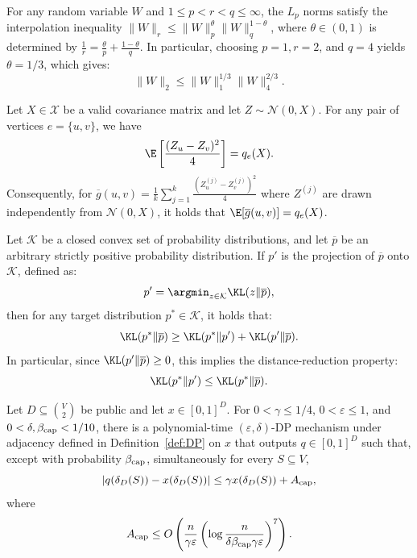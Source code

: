 \begin{lemma}\label{lem:holder_interpolation}
For any random variable $W$ and $1 \le p < r < q \le \infty$, the $L_p$ norms satisfy the interpolation inequality $\|W\|_r \le \|W\|_p^\theta \|W\|_q^{1-\theta}$, where $\theta \in (0, 1)$ is determined by $\frac{1}{r} = \frac{\theta}{p} + \frac{1-\theta}{q}$.
In particular, choosing $p=1, r=2$, and $q=4$ yields $\theta = 1/3$, which gives:
\[
    \|W\|_2 \le \|W\|_1^{1/3} \|W\|_4^{2/3}.
\]
\end{lemma}

\begin{proposition}\label{prop:unbiased_estimator}
Let $X \in \mathcal{X}$ be a valid covariance matrix and let $Z \sim \mathcal{N}(0, X)$. For any pair of vertices $e = \{u,v\}$, we have
\[
    \E\left[\frac{(Z_u - Z_v)^2}{4}\right] = q_e(X).
\]
Consequently, for $\overline{g}(u,v) = \frac{1}{k} \sum_{j=1}^k \frac{(Z^{(j)}_u - Z^{(j)}_v)^2}{4}$ where $Z^{(j)}$ are drawn independently from $\mathcal{N}(0, X)$, it holds that $\E[\overline{g}(u,v)] = q_e(X)$.
\end{proposition}

\begin{lemma}\label{lem:pythagorean}
Let $\mathcal{K}$ be a closed convex set of probability distributions, and let $\overline{p}$ be an arbitrary strictly positive probability distribution. If $p'$ is the projection of $\overline{p}$ onto $\mathcal{K}$, defined as:
\[
    p' = \argmin_{z \in \mathcal{K}} \KL(z \| \overline{p}),
\]
then for any target distribution $p^* \in \mathcal{K}$, it holds that:
\[
    \KL(p^* \| \overline{p}) \ge \KL(p^* \| p') + \KL(p' \| \overline{p}).
\]
In particular, since $\KL(p' \| \overline{p}) \ge 0$, this implies the distance-reduction property:
\[
    \KL(p^* \| p') \le \KL(p^* \| \overline{p}).
\]
\end{lemma}

\begin{lemma}\label{lem:capped-unit-release}
Let $D\subseteq\binom V2$ be public and let $x\in[0,1]^D$. For $0<\gamma\leq1/4$, $0<\varepsilon\leq1$, and $0<\delta,\beta_{\rm cap}<1/10$, there is a polynomial-time $(\varepsilon, \delta)$-DP mechanism under adjacency defined in Definition~\ref{def:DP} on $x$ that outputs $q\in[0,1]^D$ such that, except with probability $\beta_{\rm cap}$, simultaneously for every $S\subseteq V$,
\begin{equation*}
 \left|q(\delta_D(S))-x(\delta_D(S))\right| \leq \gamma x(\delta_D(S))+A_{\rm cap},
\end{equation*}
where
\[
 A_{\rm cap} \leq O\left(\frac{n}{\gamma\varepsilon}
 \left(\log\frac{n}{\delta\beta_{\rm cap}\gamma\varepsilon}\right)^7\right).
\]
\end{lemma}


